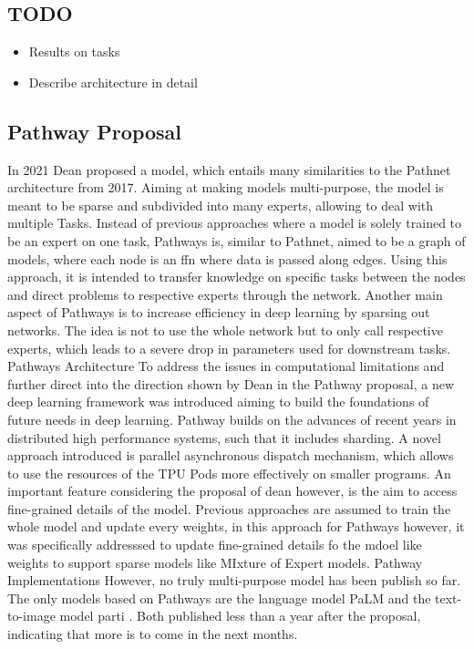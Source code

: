 \documentclass[
]{krantz}
\providecommand{\tightlist}{%
  \setlength{\itemsep}{0pt}\setlength{\parskip}{0pt}}
\begin{document}
\hypertarget{todo-2}{%
\subsection{TODO}\label{todo-2}}

\begin{itemize}
\tightlist
\item
  Results on tasks
\item
  Describe architecture in detail
\end{itemize}

\hypertarget{pathway-proposal}{%
\subsection{Pathway Proposal}\label{pathway-proposal}}

In 2021 Dean proposed a model, which entails many similarities to the Pathnet architecture from 2017. Aiming at making models multi-purpose, the model is meant to be sparse and subdivided into many experts, allowing to deal with multiple Tasks. Instead of previous approaches where a model is solely trained to be an expert on one task, Pathways is, similar to Pathnet, aimed to be a graph of models, where each node is an ffn where data is passed along edges. Using this approach, it is intended to transfer knowledge on specific tasks between the nodes and direct problems to respective experts through the network. Another main aspect of Pathways is to increase efficiency in deep learning by sparsing out networks. The idea is not to use the whole network but to only call respective experts, which leads to a severe drop in parameters used for downstream tasks.
Pathways Architecture
To address the issues in computational limitations and further direct into the direction shown by Dean in the Pathway proposal, a new deep learning framework was introduced aiming to build the foundations of future needs in deep learning.
Pathway builds on the advances of recent years in distributed high performance systems, such that it includes sharding.
A novel approach introduced is parallel asynchronous dispatch mechanism, which allows to use the resources of the TPU Pods more effectively on smaller programs.
An important feature considering the proposal of dean however, is the aim to access fine-grained details of the model. Previous approaches are assumed to train the whole model and update every weights, in this approach for Pathways however, it was specifically addresssed to update fine-grained details fo the mdoel like weights to support sparse models like MIxture of Expert models.
Pathway Implementations
However, no truly multi-purpose model has been publish so far. The only models based on Pathways are the language model PaLM \citet{Chowdhery2022} and the text-to-image model parti \citet{Yu2022}. Both published less than a year after the proposal, indicating that more is to come in the next months.
\end{document}
